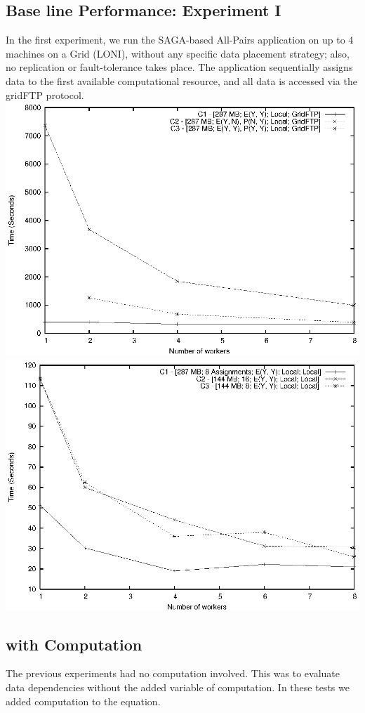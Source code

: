 \documentclass{rspublic}
\begin{document}
\subsection{Base line Performance: Experiment I} In the first experiment, we run the
SAGA-based All-Pairs application on up to 4 machines on a Grid (LONI),
without any specific data placement strategy; also, no replication or
fault-tolerance takes place.  The application sequentially assigns
data to the first available computational resource, and all data is
accessed via the gridFTP protocol.
\includegraphics[width=\textwidth]{data/graphs/ConventionalFigure.eps}
\includegraphics[width=\textwidth]{data/graphs/LocalFigure.eps}

\subsection{with Computation}
The previous experiments had no computation involved.  This was to
evaluate data dependencies without the added variable of computation.
In these tests we added computation to the equation.
\end{document}

